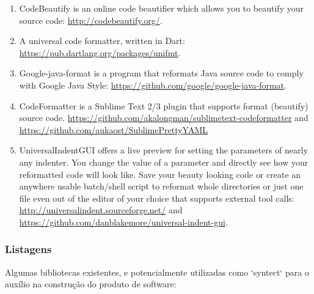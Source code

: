     \medskip
    \begin{myquote}
    \begin{enumerate}[leftmargin=*]

        \item

        CodeBeautify is an online code beautifier which allows you to beautify your source code:
        \url{http://codebeautify.org/}.

        \item

        A universal code formatter, written in Dart: \url{https://pub.dartlang.org/packages/unifmt}.

        \item

        Google-java-format is a program that reformats Java source code to comply with Google Java
        Style: \url{https://github.com/google/google-java-format}.

        \item

        CodeFormatter is a Sublime Text 2/3 plugin that supports format (beautify) source code.
        \url{https://github.com/akalongman/sublimetext-codeformatter} and
        \url{https://github.com/aukaost/SublimePrettyYAML}

        \item

        UniversalIndentGUI offers a live preview for setting the parameters of nearly any indenter.
        You change the value of a parameter and directly see how your reformatted code will look
        like. Save your beauty looking code or create an anywhere usable batch/shell script to
        reformat whole directories or just one file even out of the editor of your choice that
        supports external tool calls: \url{http://universalindent.sourceforge.net/} and
        \url{https://github.com/danblakemore/universal-indent-gui}.

    \end{enumerate}
    \end{myquote}


\subsubsection{Listagens}

    Algumas bibliotecas existentes, e potencialmente utilizadas como `syntect` para o auxílio na
    construção do produto de software:


